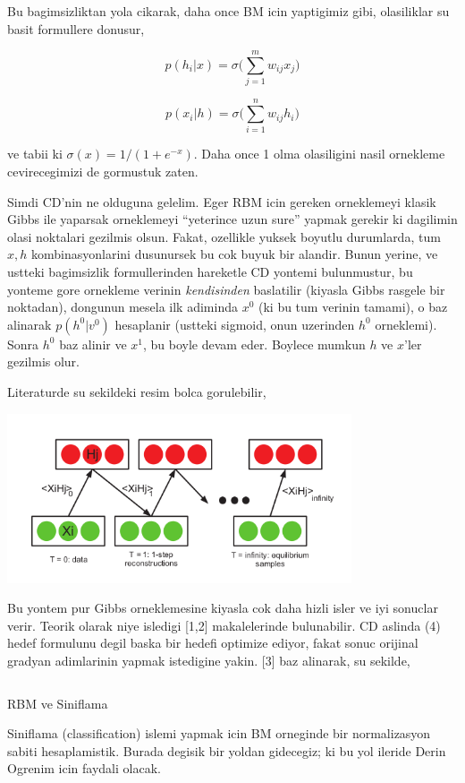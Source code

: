 \documentclass[12pt,fleqn]{article}\usepackage{../common}
\begin{document}
Bu bagimsizliktan yola cikarak, daha once BM icin yaptigimiz gibi,
olasiliklar su basit formullere donusur,

$$ p(h_i|x) = \sigma \bigg( \sum _{j=1}^{m} w_{ij} x_j \bigg) $$

$$ p(x_i|h) = \sigma \bigg( \sum _{i=1}^{n} w_{ij} h_i \bigg) $$

ve tabii ki $\sigma(x) = 1 / (1+e^{-x})$. Daha once 1 olma olasiligini
nasil ornekleme cevirecegimizi de gormustuk zaten. 

Simdi CD'nin ne olduguna gelelim. Eger RBM icin gereken orneklemeyi klasik
Gibbs ile yaparsak orneklemeyi ``yeterince uzun sure'' yapmak gerekir ki
dagilimin olasi noktalari gezilmis olsun. Fakat, ozellikle yuksek boyutlu
durumlarda, tum $x,h$ kombinasyonlarini dusunursek bu cok buyuk bir
alandir. Bunun yerine, ve ustteki bagimsizlik formullerinden hareketle CD
yontemi bulunmustur, bu yonteme gore ornekleme verinin {\em kendisinden}
baslatilir (kiyasla Gibbs rasgele bir noktadan), dongunun mesela ilk
adiminda $x^0$ (ki bu tum verinin tamami), o baz alinarak $p(h^0|v^0)$
hesaplanir (ustteki sigmoid, onun uzerinden $h^0$ orneklemi). Sonra $h^0$
baz alinir ve $x^1$, bu boyle devam eder. Boylece mumkun $h$ ve $x$'ler
gezilmis olur. 

Literaturde su sekildeki resim bolca gorulebilir,

\includegraphics[height=5cm]{rbm_03.png}

Bu yontem pur Gibbs orneklemesine kiyasla cok daha hizli isler ve iyi
sonuclar verir. Teorik olarak niye isledigi [1,2] makalelerinde
bulunabilir. CD aslinda (4) hedef formulunu degil baska bir hedefi optimize
ediyor, fakat sonuc orijinal gradyan adimlarinin yapmak istedigine
yakin. [3] baz alinarak, su sekilde,

\inputminted[fontsize=\footnotesize]{python}{rbm.py}

RBM ve Siniflama 

Siniflama (classification) islemi yapmak icin BM orneginde bir
normalizasyon sabiti hesaplamistik. Burada degisik bir yoldan gidecegiz; ki
bu yol ileride Derin Ogrenim icin faydali olacak. 
\end{document}
